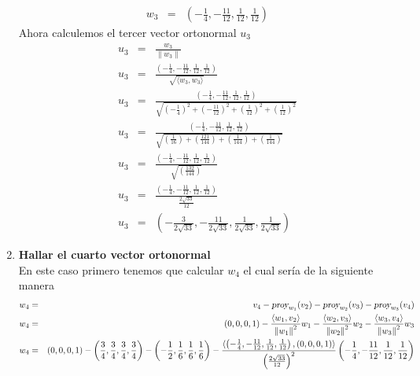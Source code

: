 \begin{enumerate}
\begin{eqnarray}
        {w}_{3} &=& \left(- \frac{1}{4},- \frac{11}{12}, \frac{1}{12}, \frac{1}{12} \right) \nonumber
    \end{eqnarray}
    Ahora calculemos el tercer vector ortonormal ${u}_{3}$
    \begin{eqnarray}
        {u}_{3} &=& \frac{{w}_{3}}{\|{w}_{3} \|} \nonumber \\
        {u}_{3} &=& \frac{\left(- \frac{1}{4},- \frac{11}{12}, \frac{1}{12}, \frac{1}{12} \right)}{\sqrt{\langle {w}_{3}, {w}_{3} \rangle}} \nonumber \\
        {u}_{3} &=& \frac{\left(- \frac{1}{4},- \frac{11}{12}, \frac{1}{12}, \frac{1}{12} \right)}{\sqrt{{\left(-\frac{1}{4} \right)}^{2}+{\left(-\frac{11}{12} \right)}^{2}+{\left(\frac{1}{12} \right)}^{2}+{\left(\frac{1}{12} \right)}^{2}}} \nonumber \\
        {u}_{3} &=& \frac{\left(- \frac{1}{4},- \frac{11}{12}, \frac{1}{12}, \frac{1}{12} \right)}{\sqrt{\left(\frac{1}{16}\right) + \left(\frac{121}{144}\right) + \left(\frac{1}{144}\right) + \left(\frac{1}{144}\right) }} \nonumber \\
        {u}_{3} &=& \frac{\left(- \frac{1}{4},- \frac{11}{12}, \frac{1}{12}, \frac{1}{12} \right)}{\sqrt{\left( \frac{132}{144} \right) }} \nonumber \\
        {u}_{3} &=& \frac{\left(- \frac{1}{4},- \frac{11}{12}, \frac{1}{12}, \frac{1}{12} \right)}{\frac{2\sqrt{33}}{12}} \nonumber \\
        {u}_{3} &=& \left(- \frac{3}{2 \sqrt{33}},- \frac{11}{2 \sqrt{33}}, \frac{1}{2 \sqrt{33}}, \frac{1}{2 \sqrt{33}} \right) \nonumber
    \end{eqnarray}
    \item \textbf{Hallar el cuarto vector ortonormal}\\
    En este caso primero tenemos que calcular ${w}_{4}$ el cual sería de la siguiente manera
    \begin{eqnarray}
        {w}_{4} &=& {v}_{4} - {\textsl{proy}}_{{w}_{1}}({v}_{2}) - {\textsl{proy}}_{{w}_{2}}({v}_{3}) - {\textsl{proy}}_{{w}_{3}}({v}_{4}) \nonumber \\
        {w}_{4} &=& (0,0,0,1) - \frac{\langle {w}_{1}, {v}_{2} \rangle}{{\| {w}_{1} \|}^{2}} {w}_{1} - \frac{\langle {w}_{2}, {v}_{3} \rangle}{{\| {w}_{2} \|}^{2}} {w}_{2} - \frac{\langle {w}_{3}, {v}_{4} \rangle}{{\| {w}_{3} \|}^{2}} {w}_{3} \nonumber \\
        {w}_{4} &=& (0,0,0,1) - \left( \frac{3}{4}, \frac{3}{4}, \frac{3}{4}, \frac{3}{4} \right) - \left(- \frac{1}{2}, \frac{1}{6}, \frac{1}{6}, \frac{1}{6} \right) - \frac{\langle \left(- \frac{1}{4},- \frac{11}{12}, \frac{1}{12}, \frac{1}{12} \right), (0,0,0,1) \rangle}{{\left( \frac{2\sqrt{33}}{12} \right)}^{2}} \left(- \frac{1}{4},- \frac{11}{12}, \frac{1}{12}, \frac{1}{12} \right) \nonumber \\

\end{eqnarray}
\end{enumerate}
